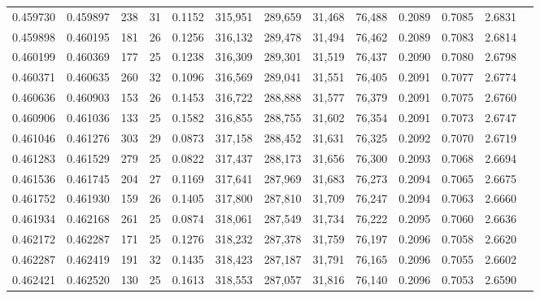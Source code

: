 \begin{tabular}{rrrrrrrrrrrrr}
0.459730 & 0.459897 &   238 &  31 &                                     0.1152 & 315,951 & 289,659 &  31,468 &  76,488 & 0.2089 & 0.7085 & 2.6831 \\
0.459898 & 0.460195 &   181 &  26 &                                     0.1256 & 316,132 & 289,478 &  31,494 &  76,462 & 0.2089 & 0.7083 & 2.6814 \\
0.460199 & 0.460369 &   177 &  25 &                                     0.1238 & 316,309 & 289,301 &  31,519 &  76,437 & 0.2090 & 0.7080 & 2.6798 \\
0.460371 & 0.460635 &   260 &  32 &                                     0.1096 & 316,569 & 289,041 &  31,551 &  76,405 & 0.2091 & 0.7077 & 2.6774 \\
0.460636 & 0.460903 &   153 &  26 &                                     0.1453 & 316,722 & 288,888 &  31,577 &  76,379 & 0.2091 & 0.7075 & 2.6760 \\
0.460906 & 0.461036 &   133 &  25 &                                     0.1582 & 316,855 & 288,755 &  31,602 &  76,354 & 0.2091 & 0.7073 & 2.6747 \\
0.461046 & 0.461276 &   303 &  29 &                                     0.0873 & 317,158 & 288,452 &  31,631 &  76,325 & 0.2092 & 0.7070 & 2.6719 \\
0.461283 & 0.461529 &   279 &  25 &                                     0.0822 & 317,437 & 288,173 &  31,656 &  76,300 & 0.2093 & 0.7068 & 2.6694 \\
0.461536 & 0.461745 &   204 &  27 &                                     0.1169 & 317,641 & 287,969 &  31,683 &  76,273 & 0.2094 & 0.7065 & 2.6675 \\
0.461752 & 0.461930 &   159 &  26 &                                     0.1405 & 317,800 & 287,810 &  31,709 &  76,247 & 0.2094 & 0.7063 & 2.6660 \\
0.461934 & 0.462168 &   261 &  25 &                                     0.0874 & 318,061 & 287,549 &  31,734 &  76,222 & 0.2095 & 0.7060 & 2.6636 \\
0.462172 & 0.462287 &   171 &  25 &                                     0.1276 & 318,232 & 287,378 &  31,759 &  76,197 & 0.2096 & 0.7058 & 2.6620 \\
0.462287 & 0.462419 &   191 &  32 &                                     0.1435 & 318,423 & 287,187 &  31,791 &  76,165 & 0.2096 & 0.7055 & 2.6602 \\
0.462421 & 0.462520 &   130 &  25 &                                     0.1613 & 318,553 & 287,057 &  31,816 &  76,140 & 0.2096 & 0.7053 & 2.6590 \\

\end{tabular}

